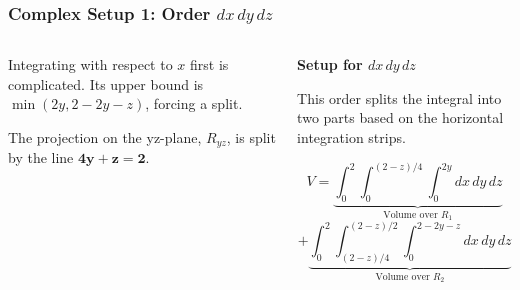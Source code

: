 \documentclass[aspectratio=169, UTF8]{beamer}
\begin{document}
\begin{frame}
    \frametitle{Complex Setup 1: Order $dx\,dy\,dz$}

    \begin{columns}[T]
        \begin{column}{0.5\textwidth}
            Integrating with respect to $x$ first is complicated. Its upper bound is $\min(2y, 2-2y-z)$, forcing a split.
            \vspace{1em}

            The projection on the yz-plane, $R_{yz}$, is split by the line $\mathbf{4y+z=2}$.

            \begin{center}
            \end{center}

        \end{column}

        \begin{column}{0.5\textwidth}
            \textbf{Setup for $dx\,dy\,dz$}
            \vspace{1em}

            This order splits the integral into two parts based on the horizontal integration strips.
            \vspace{1em}

            {\small
                $$ V = \underbrace{\int_0^2 \int_0^{(2-z)/4} \int_0^{2y} dx\,dy\,dz}_{\text{Volume over } R_1} $$
                $$ + \underbrace{\int_0^2 \int_{(2-z)/4}^{(2-z)/2} \int_0^{2-2y-z} dx\,dy\,dz}_{\text{Volume over } R_2} $$
            }



        \end{column}

    \end{columns}

\end{frame}
\end{document}

